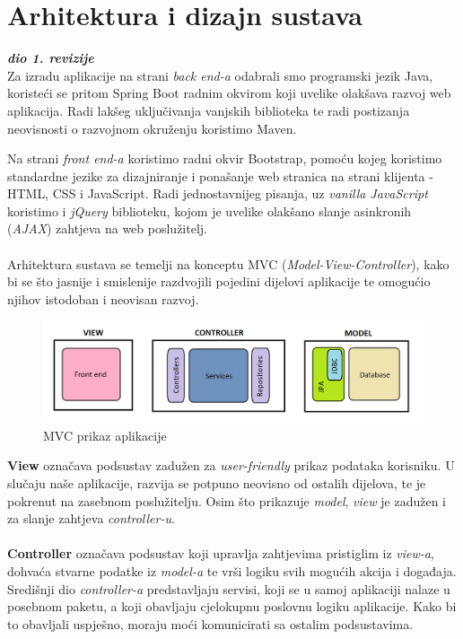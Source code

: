 \chapter{Arhitektura i dizajn sustava}

		\textbf{\textit{dio 1. revizije}}\\
	
		Za izradu aplikacije na strani \textit{back end-a} odabrali smo programski jezik Java, koristeći se pritom Spring Boot radnim okvirom koji uvelike olakšava razvoj web aplikacija. Radi lakšeg uključivanja vanjskih biblioteka te radi postizanja neovisnosti o razvojnom okruženju koristimo Maven.
		
		Na strani \textit{front end-a} koristimo radni okvir Bootstrap, pomoću kojeg koristimo standardne jezike za dizajniranje i ponašanje web stranica na strani klijenta - HTML, CSS i JavaScript. Radi jednostavnijeg pisanja, uz \textit{vanilla JavaScript} koristimo i \textit{jQuery} biblioteku, kojom je uvelike olakšano slanje asinkronih (\textit{AJAX}) zahtjeva na web poslužitelj. \\
		\\
		Arhitektura sustava se temelji na konceptu MVC (\textit{Model-View-Controller}), kako bi se što jasnije i smislenije razdvojili pojedini dijelovi aplikacije te omogućio njihov istodoban i neovisan razvoj. 
		\begin{figure}[H]
			\includegraphics[scale=0.5]{figures/MVC.png}
			\centering
			\caption{MVC prikaz aplikacije}
			\label{fig:mvc}
		\end{figure}
		
		\textbf{View} označava podsustav zadužen za \textit{user-friendly} prikaz podataka korisniku. U slučaju naše aplikacije, razvija se potpuno neovisno od ostalih dijelova, te je pokrenut na zasebnom poslužitelju. Osim što prikazuje \textit{model}, \textit{view} je zadužen i za slanje zahtjeva \textit{controller-u}.\\
		\\
		\textbf{Controller} označava podsustav koji upravlja zahtjevima pristiglim iz \textit{view-a}, dohvaća stvarne podatke iz \textit{model-a} te vrši logiku svih mogućih akcija i događaja. Središnji dio \textit{controller-a} predstavljaju servisi, koji se u samoj aplikaciji nalaze u posebnom paketu, a koji obavljaju cjelokupnu poslovnu logiku aplikacije. Kako bi to obavljali uspješno, moraju moći komunicirati sa ostalim podsustavima.
		
